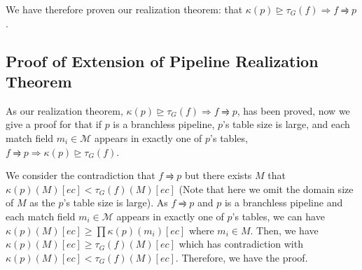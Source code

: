 We have therefore proven our realization theorem: that $\kappa(p)\trianglerighteq \tau_G(f) \Rightarrow f \rightrightharpoons p$.

\subsection{Proof of Extension of Pipeline Realization Theorem}

As our realization theorem, $\kappa(p)\trianglerighteq \tau_G(f) \Rightarrow f \rightrightharpoons p$, has been proved, now we give a proof for that if $p$ is a branchless pipeline, $p$'s table size is large, and each match field $m_i \in \mathcal{M}$ appears in exactly one of $p$'s tables, $f \rightrightharpoons p \Rightarrow \kappa(p) \trianglerighteq \tau_G(f)$.

We consider the contradiction that $f \rightrightharpoons p$ but there exists $M$ that $\kappa(p)(M)[ec] < \tau_G(f)(M)[ec]$ (Note that here we omit the domain size of $M$ as the $p$'s table size is large). As $f \rightrightharpoons p$ and $p$ is a branchless pipeline and each match field $m_i \in \mathcal{M}$ appears in exactly one of $p$'s tables, we can have $\kappa(p)(M)[ec] \ge \prod \kappa(p)(m_i)[ec]$ where $m_i \in M$. Then, we have $\kappa(p)(M)[ec] \ge \tau_G(f)(M)[ec]$ which has contradiction with $\kappa(p)(M)[ec] < \tau_G(f)(M)[ec]$. Therefore, we have the proof.

